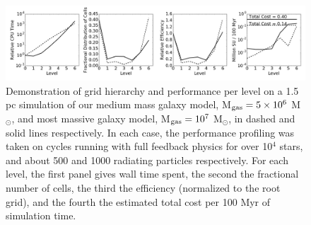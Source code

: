 \documentclass[11pt]{article}
\begin{document}

\begin{figure}
\centering
\includegraphics[width=.9\linewidth]{enzo_levels}
\caption{\small Demonstration of grid hierarchy and performance per level on a 1.5 pc simulation of our medium mass galaxy model, M$_{\rm gas} = 5 \times 10^{6}$ M$_{\odot}$, and most massive galaxy model, M$_{\rm gas} = 10^{7}$ M$_{\odot}$, in dashed and solid lines respectively. In each case, the performance profiling was taken on cycles running with full feedback physics for over 10$^{4}$ stars, and about 500 and 1000 radiating particles respectively. For each level, the first panel gives wall time spent, the second the fractional number of cells, the third the efficiency (normalized to the root grid), and the fourth the estimated total cost per 100 Myr of simulation time.}
\label{fig:levels}
\end{figure}
\end{document}
